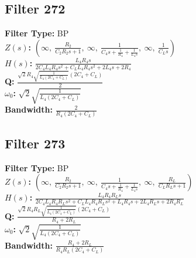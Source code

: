 \documentclass{article}
\begin{document}
\subsection*{Filter 272}
\textbf{Filter Type:} BP \\ 
\textbf{$Z(s)$:} $\left( \infty, \  \frac{R_{2}}{C_{2} R_{2} s + 1}, \  \infty, \  \frac{1}{C_{4} s + \frac{1}{R_{4}} + \frac{1}{L_{4} s}}, \  \infty, \  \frac{1}{C_{L} s}\right)$ \\ 
\textbf{$H(s)$:} $\frac{L_{4} R_{4} s}{2 C_{4} L_{4} R_{4} s^{2} + C_{L} L_{4} R_{4} s^{2} + 2 L_{4} s + 2 R_{4}}$ \\ 
\textbf{Q:} $\frac{\sqrt{2} R_{4} \sqrt{\frac{1}{L_{4} \left(2 C_{4} + C_{L}\right)}} \left(2 C_{4} + C_{L}\right)}{2}$ \\ 
\textbf{$\omega_0$:} $\sqrt{2} \sqrt{\frac{1}{L_{4} \left(2 C_{4} + C_{L}\right)}}$ \\ 
\textbf{Bandwidth:} $\frac{2}{R_{4} \left(2 C_{4} + C_{L}\right)}$ \\ 
\subsection*{Filter 273}
\textbf{Filter Type:} BP \\ 
\textbf{$Z(s)$:} $\left( \infty, \  \frac{R_{2}}{C_{2} R_{2} s + 1}, \  \infty, \  \frac{1}{C_{4} s + \frac{1}{R_{4}} + \frac{1}{L_{4} s}}, \  \infty, \  \frac{R_{L}}{C_{L} R_{L} s + 1}\right)$ \\ 
\textbf{$H(s)$:} $\frac{L_{4} R_{4} R_{L} s}{2 C_{4} L_{4} R_{4} R_{L} s^{2} + C_{L} L_{4} R_{4} R_{L} s^{2} + L_{4} R_{4} s + 2 L_{4} R_{L} s + 2 R_{4} R_{L}}$ \\ 
\textbf{Q:} $\frac{\sqrt{2} R_{4} R_{L} \sqrt{\frac{1}{L_{4} \left(2 C_{4} + C_{L}\right)}} \left(2 C_{4} + C_{L}\right)}{R_{4} + 2 R_{L}}$ \\ 
\textbf{$\omega_0$:} $\sqrt{2} \sqrt{\frac{1}{L_{4} \left(2 C_{4} + C_{L}\right)}}$ \\ 
\textbf{Bandwidth:} $\frac{R_{4} + 2 R_{L}}{R_{4} R_{L} \left(2 C_{4} + C_{L}\right)}$ \\ 
\end{document}
